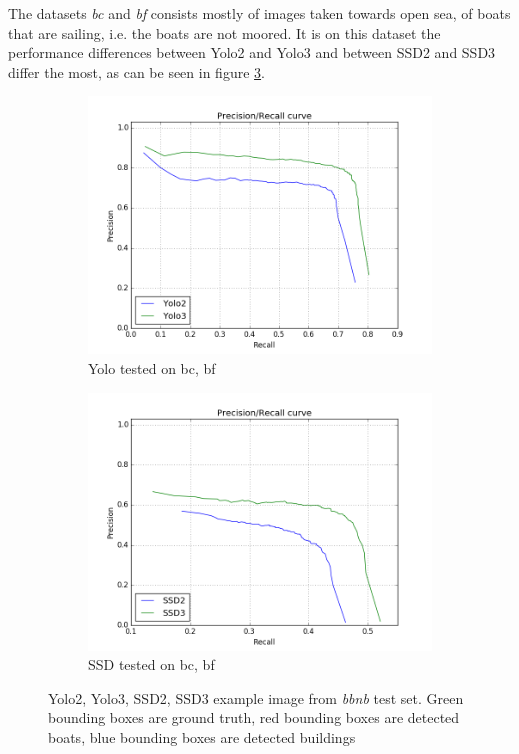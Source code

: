 The datasets \textit{bc} and \textit{bf} consists mostly of images taken towards open sea, of boats that are sailing, i.e. the boats are not moored. It is on this dataset the performance differences between Yolo2 and Yolo3 and between SSD2 and SSD3 differ the most, as can be seen in figure \ref{fig:bcbf_prec}.

\begin{figure}[h!]
\begin{subfigure}{.5\textwidth}
  \centering
  \includegraphics[width=0.8\linewidth]{results/case_buildings/prec_recall/yolo/bcbf.png}
  \caption{Yolo tested on bc, bf}
  \label{fig:ex_bcbf_prec_rec_yolo}
\end{subfigure}%
\begin{subfigure}{.5\textwidth}
  \centering
  \includegraphics[width=.8\linewidth]{results/case_buildings/prec_recall/ssd/bcbf.png}
  \caption{SSD tested on bc, bf}
  \label{fig:ex_bcbf_prec_rec_ssd}
\end{subfigure}
\caption{Yolo2, Yolo3, SSD2, SSD3 example image from \textit{bbnb} test set. Green bounding boxes are ground truth, red bounding boxes are detected boats, blue bounding boxes are detected buildings}
\label{fig:bcbf_prec}
\end{figure}

